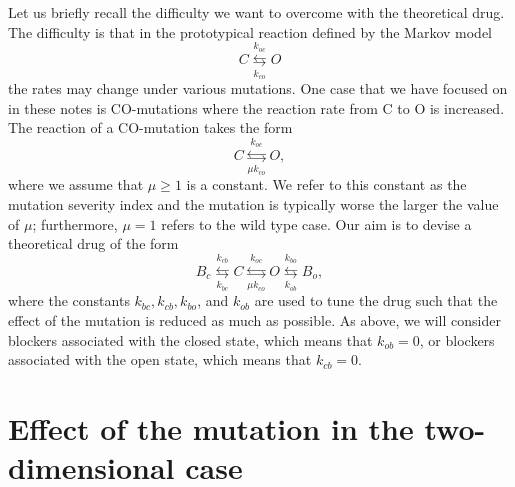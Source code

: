 Let us briefly recall the difficulty we want to overcome with the
theoretical drug. The difficulty is that in the prototypical reaction
defined by the Markov model%
\[
C\underset{k_{co}}{\overset{k_{oc}}{\leftrightarrows}}O
\]
the rates may change under various mutations. One case that we have focused on 
in these notes is CO-mutations where the reaction rate from C to O is increased.
The reaction of a CO-mutation takes the form%
\[
C\underset{ \mu k_{co}}{\overset{k_{oc}}{\leftrightarrows}}O,
\]
where we assume that $\mu\geqslant1$ is a constant. We refer to this constant
as the mutation severity index and the mutation is typically worse the larger
the value of $\mu$; furthermore, $\mu=1$ refers to the wild type case.
Our aim is to devise a theoretical drug of the form 
\[
B_c\underset{k_{bc}}{\overset{k_{cb}}{\leftrightarrows}}C\underset{\mu k_{co}%
}{\overset{k_{oc}}{\leftrightarrows}}O\underset{k_{ob}}{\overset{k_{bo}}{\leftrightarrows}}B_o,
\]
where the constants $k_{bc}, k_{cb}, k_{bo}$, and $k_{ob}$ are used to tune the drug such 
that the effect of the mutation is reduced as much as possible. As above, we will consider blockers associated with
the closed state, which means that $k_{ob}=0$, or blockers associated with the open state, which means that $k_{cb}=0$.



\section[Effect of the mutation in 2D]{Effect of the mutation in the two-dimensional case}

